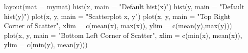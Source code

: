 \begin{Schunk}
\begin{Sinput}
 layout(mat = mymat)
 hist(x, main = "Default hist(x)")
 hist(y, main = "Default hist(y)")
 plot(x, y, main = "Scatterplot x, y")
 plot(x, y, main = "Top Right Corner of Scatter", xlim = c(mean(x), max(x)), ylim = c(mean(y),max(y)))
 plot(x, y, main = "Bottom Left Corner of Scatter", xlim = c(min(x), mean(x)), ylim = c(min(y), mean(y)))
\end{Sinput}
\end{Schunk}
